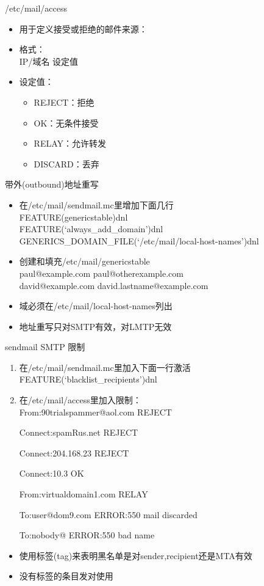 \begin{frame}{/etc/mail/access}
\begin{itemize}
\item 用于定义接受或拒绝的邮件来源：
\item 格式：\\
IP/域名 设定值
\item 设定值：

\begin{itemize}
\item REJECT：拒绝
\item OK：无条件接受
\item RELAY：允许转发
\item DISCARD：丢弃
\end{itemize}
\end{itemize}

\end{frame} 
\begin{frame}{带外(outbound)地址重写}
\begin{itemize}
\item 在/etc/mail/sendmail.mc里增加下面几行\\
FEATURE(genericstable)dnl\\
FEATURE(`always\_add\_domain')dnl\\
GENERICS\_DOMAIN\_FILE(`/etc/mail/local-host-names')dnl
\item 创建和填充/etc/mail/genericstable\\
paul@example.com paul@otherexample.com\\
david@example.com david.lastname@example.com
\item 域必须在/etc/mail/local-host-names列出
\item 地址重写只对SMTP有效，对LMTP无效
\end{itemize}

\end{frame} 
\begin{frame}{sendmail SMTP 限制}
\begin{enumerate}
\item 在/etc/mail/sendmail.mc里加入下面一行激活\\
FEATURE(`blacklist\_recipients')dnl
\item 在/etc/mail/access里加入限制：\\
From:90trialspammer@aol.com REJECT


Connect:spamRus.net REJECT


Connect:204.168.23 REJECT


Connect:10.3 OK


From:virtualdomain1.com RELAY


To:user@dom9.com ERROR:550 mail discarded


To:nobody@ ERROR:550 bad name

\end{enumerate}
\begin{itemize}
\item 使用标签(tag)来表明黑名单是对sender,recipient还是MTA有效
\item 没有标签的条目发对使用
\end{itemize}

\end{frame} 

